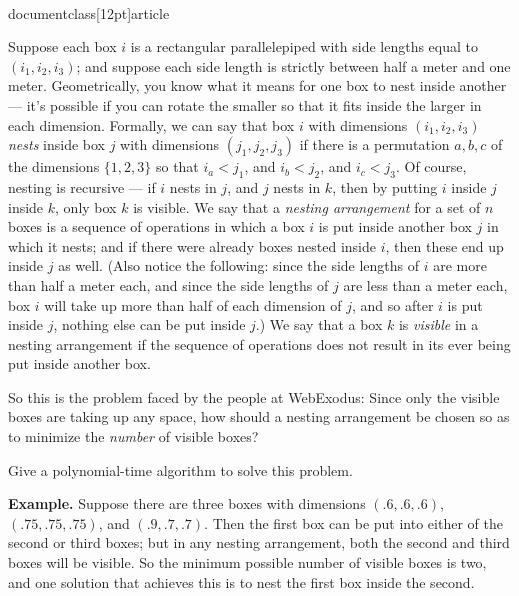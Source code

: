 \\documentclass[12pt]{article}
\begin{document}
\begin{enumerate}
Suppose each box $i$ is a rectangular parallelepiped
with side lengths equal to $(i_1, i_2, i_3)$;
and suppose each side length is strictly between half a meter and one meter.
Geometrically, you know what it means for one box
to nest inside another --- it's possible if you can rotate the
smaller so that it fits inside the larger in each dimension.
Formally, we can say that box $i$ with dimensions $(i_1, i_2, i_3)$
{\em nests} inside box $j$ with dimensions $(j_1, j_2, j_3)$ if
there is a permutation $a, b, c$ of the dimensions $\{1, 2, 3\}$
so that $i_a < j_1$, and $i_b < j_2$, and $i_c < j_3$.
Of course, nesting is recursive --- if $i$ nests in $j$,
and $j$ nests in $k$, then by putting $i$ inside $j$ inside $k$,
only box $k$ is visible.
We say that a {\em nesting arrangement} for a set
of $n$ boxes is a sequence of operations in which
a box $i$ is put inside another box $j$ in which it nests;
and if there were already boxes nested inside $i$,
then these end up inside $j$ as well.
(Also notice the following:
since the side lengths of $i$ are more than half a meter each,
and since the side lengths of $j$ are less than a meter each,
box $i$ will take up more than half of each dimension of $j$,
and so after $i$ is put inside $j$, nothing else can be put inside $j$.)
We say that a box $k$ is {\em visible} in a nesting
arrangement if the sequence of operations does not
result in its ever being put inside another box.

So this is the problem faced by the people at WebExodus:
Since only the visible boxes are taking up any space,
how should a nesting arrangement be chosen
so as to minimize the {\em number} of visible boxes?

Give a polynomial-time algorithm to solve this problem.

\smallskip
{\bf Example.} Suppose there are three boxes with dimensions
$(.6, .6, .6)$, $(.75, .75, .75)$, and $(.9, .7, .7)$.
Then the first box can be put into either of the second
or third boxes;
but in any nesting arrangement, both the
second and third boxes will be visible.
So the minimum possible number of visible boxes is two,
and one solution that achieves this is to
nest the first box inside the second.

\end{enumerate}
\end{document}
